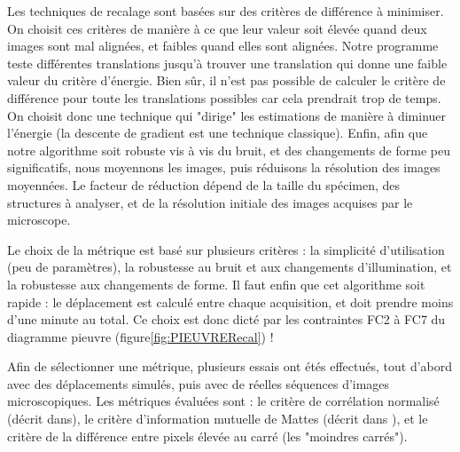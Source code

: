Les techniques de recalage sont basées sur des critères de différence à minimiser.
On choisit ces critères de manière à ce que leur valeur soit élevée quand deux images sont mal alignées,
et faibles quand elles sont alignées. Notre programme teste différentes translations jusqu'à trouver une translation
qui donne une faible valeur du critère d'énergie.
Bien sûr, il n'est pas possible de calculer le critère de différence pour toute les translations possibles car cela prendrait trop de temps.
On choisit donc une technique qui "dirige" les estimations de manière à diminuer l'énergie
(la descente de gradient est une technique classique).
Enfin, afin que notre algorithme soit robuste vis à vis du bruit, et des changements de forme peu significatifs,
nous moyennons les images, puis réduisons la résolution des images moyennées.
Le facteur de réduction dépend de la taille du spécimen, des structures à analyser,
et de la résolution initiale des images acquises par le microscope.

Le choix de la métrique est basé sur plusieurs critères : la simplicité d'utilisation (peu de paramètres),
la robustesse au bruit et aux changements d'illumination, et la robustesse aux changements de forme. Il faut enfin que cet algorithme soit rapide : le déplacement est calculé entre chaque acquisition, et doit prendre moins d'une minute au total. Ce choix est donc dicté par les contraintes FC2 à FC7 du diagramme pieuvre (figure\ref{fig:PIEUVRERecal}) !

Afin de sélectionner une métrique, plusieurs essais ont étés effectués, tout d'abord avec des déplacements simulés,
puis avec de réelles séquences d'images microscopiques. Les métriques évaluées sont : le critère de corrélation normalisé (décrit dans\cite{registrationCrossCorr}), le critère d'information mutuelle de Mattes (décrit dans \cite{mattes2001nonrigid}), et le critère de la différence entre pixels élevée au carré (les "moindres carrés").

